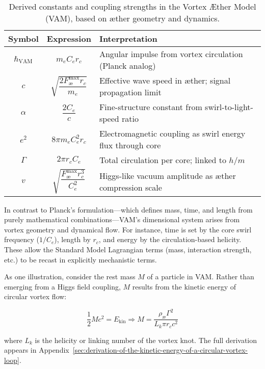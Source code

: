 \begin{table}[H]
    \centering
    \footnotesize
    \renewcommand{\arraystretch}{1.3}
    \begin{tabular}{|c|c|l|}
        \hline
        \textbf{Symbol} & \textbf{Expression} & \textbf{Interpretation} \\
        \hline
        $\hbar_\text{VAM}$ & $m_e C_e r_c$ & Angular impulse from vortex circulation (Planck analog) \\
        \hline
        $c$ & $\sqrt{\dfrac{2 F^{\text{max}}_{\text{\ae}} r_c}{m_e}}$ & Effective wave speed in æther; signal propagation limit \\
        \hline
        $\alpha$ & $\dfrac{2 C_e}{c}$ & Fine-structure constant from swirl-to-light-speed ratio \\
        \hline
        $e^2$ & $8\pi m_e C_e^2 r_c$ & Electromagnetic coupling as swirl energy flux through core \\
        \hline
        $\Gamma$ & $2\pi r_c C_e$ & Total circulation per core; linked to $h/m$ \\
        \hline
        $v$ & $\sqrt{\dfrac{F^{\text{max}}_{\text{\ae}} r_c^3}{C_e^2}}$ & Higgs-like vacuum amplitude as æther compression scale \\
        \hline
    \end{tabular}
    \caption{Derived constants and coupling strengths in the Vortex Æther Model (VAM), based on æther geometry and dynamics.}
    \label{tab:VAM_constants}
\end{table}

In contrast to Planck's formulation—which defines mass, time, and length from purely mathematical combinations—VAM's dimensional system arises from vortex geometry and dynamical flow. For instance, time is set by the core swirl frequency ($1/C_e$), length by $r_c$, and energy by the circulation-based helicity. These allow the Standard Model Lagrangian terms (mass, interaction strength, etc.) to be recast in explicitly mechanistic terms.

As one illustration, consider the rest mass $M$ of a particle in VAM. Rather than emerging from a Higgs field coupling, $M$ results from the kinetic energy of circular vortex flow:

\begin{equation}
    \frac{1}{2} M c^2 = E_\text{kin} \Rightarrow M = \frac{\rho_\text{\ae} \Gamma^2}{L_k \pi r_c c^2}
\end{equation}

where $L_k$ is the helicity or linking number of the vortex knot. The full derivation appears in Appendix~\ref{sec:derivation-of-the-kinetic-energy-of-a-circular-vortex-loop}.

